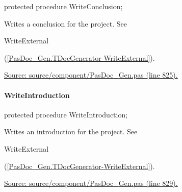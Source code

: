 \documentclass{report}
\newif\ifpdf
\begin{document}
\label{PasDoc_Gen.TDocGenerator-WriteConclusion}
\begin{list}{}{
\setlength{\itemindent}{0cm}
\setlength{\listparindent}{0cm}
\setlength{\leftmargin}{\evensidemargin}
\addtolength{\leftmargin}{\tmplength}
\settowidth{\labelsep}{X}
\addtolength{\leftmargin}{\labelsep}
\setlength{\labelwidth}{\tmplength}
}
\item[\textbf{Declaration}\hfill]
\ifpdf
\begin{flushleft}
\fi
\begin{ttfamily}
protected procedure WriteConclusion;\end{ttfamily}

\ifpdf
\end{flushleft}
\fi

\par
\item[\textbf{Description}]
Writes a conclusion for the project. See \begin{ttfamily}WriteExternal\end{ttfamily}(\ref{PasDoc_Gen.TDocGenerator-WriteExternal}).\par
\href{https://github.com/pasdoc/pasdoc/blob/master/source/component/PasDoc_Gen.pas#L825}{Source: source/component/PasDoc{\_}Gen.pas (line 825).}

\end{list}
\paragraph*{WriteIntroduction}\hspace*{\fill}

\label{PasDoc_Gen.TDocGenerator-WriteIntroduction}
\begin{list}{}{
\setlength{\itemindent}{0cm}
\setlength{\listparindent}{0cm}
\setlength{\leftmargin}{\evensidemargin}
\addtolength{\leftmargin}{\tmplength}
\settowidth{\labelsep}{X}
\addtolength{\leftmargin}{\labelsep}
\setlength{\labelwidth}{\tmplength}
}
\item[\textbf{Declaration}\hfill]
\ifpdf
\begin{flushleft}
\fi
\begin{ttfamily}
protected procedure WriteIntroduction;\end{ttfamily}

\ifpdf
\end{flushleft}
\fi

\par
\item[\textbf{Description}]
Writes an introduction for the project. See \begin{ttfamily}WriteExternal\end{ttfamily}(\ref{PasDoc_Gen.TDocGenerator-WriteExternal}).\par
\href{https://github.com/pasdoc/pasdoc/blob/master/source/component/PasDoc_Gen.pas#L829}{Source: source/component/PasDoc{\_}Gen.pas (line 829).}

\end{list}
\end{document}
